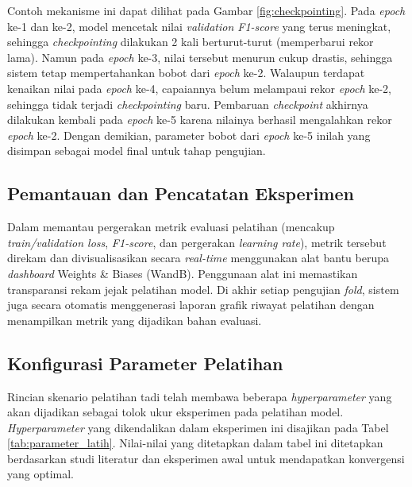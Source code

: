 \begin{enumerate}
    Contoh mekanisme ini dapat dilihat pada Gambar \ref{fig:checkpointing}.
    Pada \textit{epoch} ke-1 dan ke-2, model mencetak nilai \textit{validation F1-score} yang terus meningkat, sehingga \textit{checkpointing} dilakukan 2 kali berturut-turut (memperbarui rekor lama).
    Namun pada \textit{epoch} ke-3, nilai tersebut menurun cukup drastis, sehingga sistem tetap mempertahankan bobot dari \textit{epoch} ke-2.
    Walaupun terdapat kenaikan nilai pada \textit{epoch} ke-4, capaiannya belum melampaui rekor \textit{epoch} ke-2, sehingga tidak terjadi \textit{checkpointing} baru.
    Pembaruan \textit{checkpoint} akhirnya dilakukan kembali pada \textit{epoch} ke-5 karena nilainya berhasil mengalahkan rekor \textit{epoch} ke-2.
    Dengan demikian, parameter bobot dari \textit{epoch} ke-5 inilah yang disimpan sebagai model final untuk tahap pengujian. \par

\end{enumerate}

\subsection{Pemantauan dan Pencatatan Eksperimen}
Dalam memantau pergerakan metrik evaluasi pelatihan (mencakup \textit{train/validation loss}, \textit{F1-score}, dan pergerakan \textit{learning rate}), metrik tersebut direkam dan divisualisasikan secara \textit{real-time} menggunakan alat bantu berupa \textit{dashboard} Weights \& Biases (WandB).
Penggunaan alat ini memastikan transparansi rekam jejak pelatihan model.
Di akhir setiap pengujian \textit{fold}, sistem juga secara otomatis menggenerasi laporan grafik riwayat pelatihan dengan menampilkan metrik yang dijadikan bahan evaluasi.

\subsection{Konfigurasi Parameter Pelatihan} \label{sec:konfigurasi_eksperimen}
Rincian skenario pelatihan tadi telah membawa beberapa \textit{hyperparameter} yang akan dijadikan sebagai tolok ukur eksperimen pada pelatihan model.
\textit{Hyperparameter} yang dikendalikan dalam eksperimen ini disajikan pada Tabel \ref{tab:parameter_latih}.
Nilai-nilai yang ditetapkan dalam tabel ini ditetapkan berdasarkan studi literatur dan eksperimen awal untuk mendapatkan konvergensi yang optimal.\par

